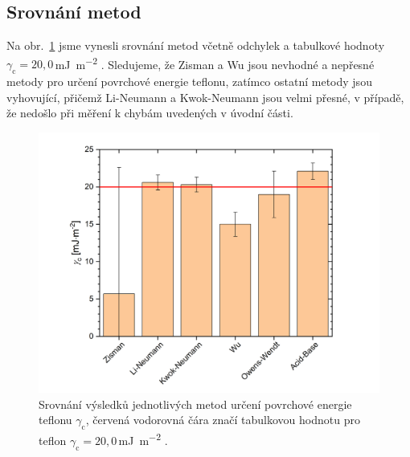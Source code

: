 \documentclass{protokol}
\begin{document}
\subsection{Srovnání metod}
\par Na obr.~\ref{graph:srovnani} jsme vynesli srovnání metod včetně odchylek a 
tabulkové hodnoty $\gamma_{\text{c}} = 
20,0$\,\si{\milli\joule\per\meter\squared} \cite{napetiTeflon}. Sledujeme, že 
Zisman a Wu jsou nevhodné a nepřesné metody pro určení povrchové energie 
teflonu, zatímco ostatní metody jsou vyhovující, přičemž Li-Neumann a 
Kwok-Neumann jsou velmi přesné, v případě, že nedošlo při měření k chybám 
uvedených v úvodní části.
\begin{figure}[h!]
	\centering
	\includegraphics[width=130mm]{srovnani.png}
	\caption{Srovnání výsledků jednotlivých metod určení povrchové energie 
	teflonu $\gamma_{\text{c}}$, červená vodorovná čára značí tabulkovou 
	hodnotu pro teflon $\gamma_{\text{c}} = 
	20,0$\,\si{\milli\joule\per\meter\squared} \cite{napetiTeflon}.}
	\label{graph:srovnani}
\end{figure}
\end{document}
